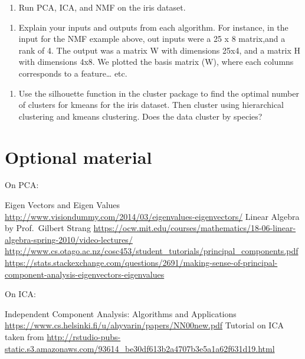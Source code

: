 \documentclass[11pt,]{article}
\providecommand{\tightlist}{%
  \setlength{\itemsep}{0pt}\setlength{\parskip}{0pt}}
\begin{document}
\begin{enumerate}
\def\labelenumi{\arabic{enumi}.}
\tightlist
\item
  Run PCA, ICA, and NMF on the iris dataset.
\end{enumerate}

\begin{enumerate}
\def\labelenumi{\alph{enumi}.}
\tightlist
\item
  Explain your inputs and outputs from each algorithm. For instance, in
  the input for the NMF example above, out inputs were a 25 x 8
  matrix,and a rank of 4. The output was a matrix W with dimensions
  25x4, and a matrix H with dimensions 4x8. We plotted the basis matrix
  (W), where each columns corresponds to a feature\ldots{} etc.
\end{enumerate}

\begin{enumerate}
\def\labelenumi{\arabic{enumi}.}
\setcounter{enumi}{1}
\tightlist
\item
  Use the silhouette function in the cluster package to find the optimal
  number of clusters for kmeans for the iris dataset. Then cluster using
  hierarchical clustering and kmeans clustering. Does the data cluster
  by species?
\end{enumerate}

\hypertarget{optional-material}{%
\section{Optional material}\label{optional-material}}

On PCA:

Eigen Vectors and Eigen Values
\url{http://www.visiondummy.com/2014/03/eigenvalues-eigenvectors/}
Linear Algebra by Prof.~Gilbert Strang
\url{https://ocw.mit.edu/courses/mathematics/18-06-linear-algebra-spring-2010/video-lectures/}
\url{http://www.cs.otago.ac.nz/cosc453/student_tutorials/principal_components.pdf}
\url{https://stats.stackexchange.com/questions/2691/making-sense-of-principal-component-analysis-eigenvectors-eigenvalues}

On ICA:

Independent Component Analysis: Algorithms and Applications
\url{https://www.cs.helsinki.fi/u/ahyvarin/papers/NN00new.pdf} Tutorial
on ICA taken from
\url{http://rstudio-pubs-static.s3.amazonaws.com/93614_be30df613b2a4707b3e5a1a62f631d19.html}
\end{document}
